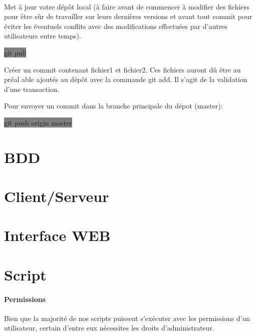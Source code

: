 \documentclass[11pt,a4paper,titlepage, oneside]{article}
\begin{document}
		\paragraph{}
			Met à jour votre dépôt local (à faire avant de commencer à modifier des fichiers pour être sûr de travailler sur leurs dernières versions et avant tout commit pour éviter les éventuels conflits avec des modifications effectuées par d'autres utilisateurs entre temps). 

			\colorbox{gray}{git pull}

			Créer un commit contenant fichier1 et fichier2. Ces fichiers auront dû être au préal able ajoutés au dépôt avec la commande git add. Il s'agit de la validation d'une transaction. 

			Pour envoyer un commit dans la branche principale du dépot (master):
			
			\colorbox{gray}{git push origin master}	

\newpage
\section{{\color{red} BDD}}
	\paragraph{}
\newpage
\section{{\color{red} Client/Serveur}}

\newpage
\section{{\color{red} Interface WEB}}

\newpage
\section{{\color{red} Script }}
	\paragraph{Permissions}
		Bien que la majorité de nos scripts puissent s'exécuter avec les permissions d'un utilisateur, certain d'entre eux nécessites les droits d'administrateur.\\
\end{document}

